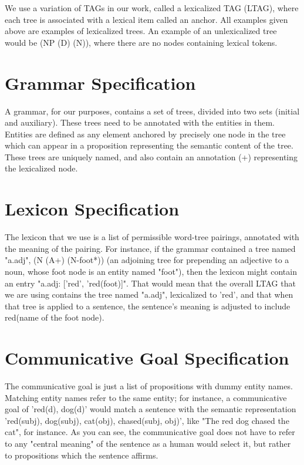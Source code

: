 We use a variation of TAGs in our work, called a lexicalized TAG (LTAG), where each tree is
associated with a lexical item called an anchor.  All examples given above are examples of
lexicalized trees.  An example of an unlexicalized tree would be (NP (D) (N)), where there
are no nodes containing lexical tokens.

\section{Grammar Specification}

A grammar, for our purposes, contains a set of trees, divided into two sets (initial and auxiliary).
These trees need to be annotated with the entities in them.  Entities are defined as any element
anchored by precisely one node in the tree which can appear in a proposition representing the
semantic content of the tree.  These trees are uniquely named, and also contain an
annotation (+) representing the lexicalized node.

\section{Lexicon Specification}

The lexicon that we use is a list of permissible word-tree pairings, annotated with the meaning of
the pairing.  For instance, if the grammar contained a tree named "a.adj", (N (A+) (N-foot*))
(an adjoining tree for prepending an adjective to a noun, whose foot node is an entity named "foot"),
then the lexicon might contain an entry "a.adj: ['red', 'red(foot)]".  That would mean that the overall
LTAG that we are using contains the tree named "a.adj", lexicalized to 'red', and that when that tree
is applied to a sentence, the sentence's meaning is adjusted to include red(name of the foot node).

\section{Communicative Goal Specification}

The communicative goal is just a list of propositions with dummy entity names.  Matching entity
names refer to the same entity; for instance, a communicative goal of 'red(d), dog(d)' would
match a sentence with the semantic representation 'red(subj), dog(subj), cat(obj), chased(subj, obj)',
like "The red dog chased the cat", for instance.  As you can see, the communicative goal does
not have to refer to any "central meaning" of the sentence as a human would select it, but rather
to propositions which the sentence affirms.


